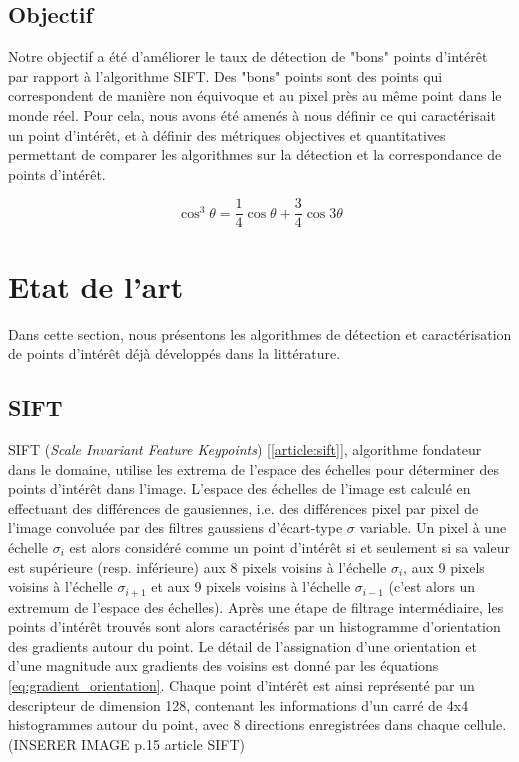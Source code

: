 \documentclass[
	a4paper, %
	10pt, %
	unnumberedsections, %
	twoside, %
]{LTJournalArticle}
\begin{document}
\subsection{Objectif}

Notre objectif a été d'améliorer le taux de détection de "bons" points d'intérêt par rapport à l'algorithme SIFT. Des "bons" points sont des points qui correspondent de manière non équivoque et au pixel près au même point dans le monde réel.
Pour cela, nous avons été amenés à nous définir ce qui caractérisait un point d'intérêt, et à définir des métriques objectives et quantitatives permettant de comparer les algorithmes sur la détection et la correspondance de points d'intérêt.

\begin{equation}
	\cos^3 \theta =\frac{1}{4}\cos\theta+\frac{3}{4}\cos 3\theta
	\label{eq:example}
\end{equation}

\section{Etat de l'art}

Dans cette section, nous présentons les algorithmes de détection et caractérisation de points d'intérêt déjà développés dans la littérature.

\subsection{SIFT}

SIFT (\textit{Scale Invariant Feature Keypoints}) [\ref{article:sift}], algorithme fondateur dans le domaine, utilise les extrema de l'espace des échelles pour déterminer des points d'intérêt dans l'image.
L'espace des échelles de l'image est calculé en effectuant des différences de gausiennes, i.e. des différences pixel par pixel de l'image convoluée par des filtres gaussiens d'écart-type $\sigma$ variable.
Un pixel à une échelle $\sigma_i$ est alors considéré comme un point d'intérêt si et seulement si sa valeur est supérieure (resp. inférieure) aux 8 pixels voisins à l'échelle $\sigma_i$, aux 9 pixels voisins à l'échelle $\sigma_{i+1}$ et aux 9 pixels voisins à l'échelle $\sigma_{i-1}$ (c'est alors un extremum de l'espace des échelles).
Après une étape de filtrage intermédiaire, les points d'intérêt trouvés sont alors caractérisés par un histogramme d'orientation des gradients autour du point.
Le détail de l'assignation d'une orientation et d'une magnitude aux gradients des voisins est donné par les équations \ref{eq:gradient_orientation}.
Chaque point d'intérêt est ainsi représenté par un descripteur de dimension 128, contenant les informations d'un carré de 4x4 histogrammes autour du point, avec 8 directions enregistrées dans chaque cellule. (INSERER IMAGE p.15 article SIFT)
\end{document}

